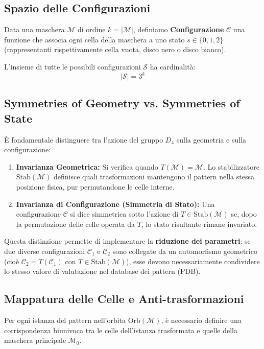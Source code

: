 \subsection{Spazio delle Configurazioni}
Data una maschera $\mathcal{M}$ di ordine $k = |\mathcal{M}|$, definiamo \textbf{Configurazione} $\mathcal{C}$ una funzione che associa ogni cella della maschera a uno stato $s \in \{0, 1, 2\}$ (rappresentanti rispettivamente cella vuota, disco nero o disco bianco). 

L'insieme di tutte le possibili configurazioni $\mathcal{S}$ ha cardinalità:
\begin{equation}
    |\mathcal{S}| = 3^k
\end{equation}

\subsection{Symmetries of Geometry vs. Symmetries of State}
È fondamentale distinguere tra l'azione del gruppo $D_4$ sulla geometria e sulla configurazione:
\begin{enumerate}
    \item \textbf{Invarianza Geometrica:} Si verifica quando $T(\mathcal{M}) = \mathcal{M}$. Lo stabilizzatore $\text{Stab}(\mathcal{M})$ definisce quali trasformazioni mantengono il pattern nella stessa posizione fisica, pur permutandone le celle interne.
    \item \textbf{Invarianza di Configurazione (Simmetria di Stato):} Una configurazione $\mathcal{C}$ si dice simmetrica sotto l'azione di $T \in \text{Stab}(\mathcal{M})$ se, dopo la permutazione delle celle operata da $T$, lo stato risultante rimane invariato. 
\end{enumerate}

Questa distinzione permette di implementare la \textbf{riduzione dei parametri}: se due diverse configurazioni $\mathcal{C}_1$ e $\mathcal{C}_2$ sono collegate da un automorfismo geometrico (cioè $\mathcal{C}_2 = T(\mathcal{C}_1)$ con $T \in \text{Stab}(\mathcal{M})$), esse devono necessariamente condividere lo stesso valore di valutazione nel database dei pattern (PDB).
\subsection{Mappatura delle Celle e Anti-trasformazioni}

Per ogni istanza del pattern nell'orbita $\text{Orb}(\mathcal{M})$, è necessario definire una corrispondenza biunivoca tra le celle dell'istanza trasformata e quelle della maschera principale $\mathcal{M}_0$.

